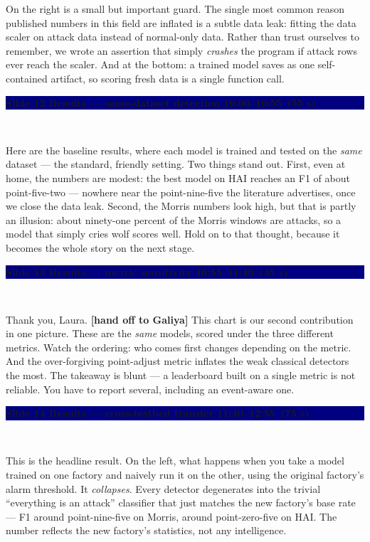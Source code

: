 \documentclass[11pt,a4paper]{article}
\newcommand{\spk}[1]{{\color{teal}\bfseries #1}}
\newcommand{\slide}[5]{%
  \medskip
  \noindent\colorbox{navy}{\parbox{\dimexpr\textwidth-2\fboxsep}{%
    \color{white}\bfseries Slide #1 \;\textbar\; #2
    \hfill {\normalfont\color{lightbg}\small #4 \,(#5)}}}\\[2pt]
  \noindent{\color{teal}\small\textbf{Speaker: #3}}\par\vspace{2pt}%
}
\begin{document}
On the right is a small but important guard. The single most common reason published numbers in this field are inflated is a subtle data leak: fitting the data scaler on attack data instead of normal-only data. Rather than trust ourselves to remember, we wrote an assertion that simply \textit{crashes} the program if attack rows ever reach the scaler. And at the bottom: a trained model saves as one self-contained artifact, so scoring fresh data is a single function call.

\slide{12}{Results --- same-dataset detection}{Laura}{10:00--10:55}{55 s}
Here are the baseline results, where each model is trained and tested on the \textit{same} dataset --- the standard, friendly setting. Two things stand out. First, even at home, the numbers are modest: the best model on HAI reaches an F1 of about point-five-two --- nowhere near the point-nine-five the literature advertises, once we close the data leak. Second, the Morris numbers look high, but that is partly an illusion: about ninety-one percent of the Morris windows are attacks, so a model that simply cries wolf scores well. Hold on to that thought, because it becomes the whole story on the next stage.

\slide{13}{Results --- metric sensitivity}{Galiya}{10:55--11:40}{45 s}
Thank you, Laura. \spk{[hand off to Galiya]} This chart is our second contribution in one picture. These are the \textit{same} models, scored under the three different metrics. Watch the ordering: who comes first changes depending on the metric. And the over-forgiving point-adjust metric inflates the weak classical detectors the most. The takeaway is blunt --- a leaderboard built on a single metric is not reliable. You have to report several, including an event-aware one.

\slide{14}{Results --- cross-testbed transfer}{Galiya}{11:40--12:55}{75 s}
This is the headline result. On the left, what happens when you take a model trained on one factory and naively run it on the other, using the original factory's alarm threshold. It \textit{collapses}. Every detector degenerates into the trivial ``everything is an attack'' classifier that just matches the new factory's base rate --- F1 around point-nine-five on Morris, around point-zero-five on HAI. The number reflects the new factory's statistics, not any intelligence.
\end{document}

